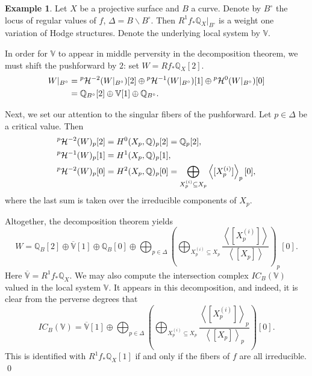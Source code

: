 \documentclass[12pt]{amsart}
\newcommand{\Q}{\mathbb{Q}}
\newcommand{\ol}{\overline}
\newcommand{\pH}{\prescript{p}{}{\mathcal{H}}}
\theoremstyle{definition}
\newtheorem{example}[theorem]{Example}
\theoremstyle{remark}
\numberwithin{equation}{section}
\begin{document}
\begin{example}
Let \(X\) be a projective surface and \(B\) a curve. Denote by \(B^\circ\) the locus 
of regular values of \(f\), \(\Delta = B \smallsetminus B^\circ\). Then
\(R^1 f_* \Q_X|_{B^\circ}\) is a weight one variation of Hodge structures. Denote 
the underlying local system by \(\mathbb{V}\).

In order for \(\mathbb{V}\) to appear in middle perversity in the decomposition theorem, 
we must shift the pushforward by \(2\): set \(W = Rf_* \Q_X[2]\).
\begin{align*}
    W|_{B^\circ} &= \pH^{-2}(W|_{B^\circ})[2] \oplus 
    \pH^{-1}(W|_{B^\circ})[1] \oplus \pH^0(W|_{B^\circ})[0] \\
    &= \Q_{B^\circ}[2] \oplus \mathbb{V}[1] \oplus \Q_{B^\circ}.
\end{align*}

Next, we set our attention to the singular fibers of the pushforward. Let 
\(p \in \Delta\) be a critical value. Then
\begin{align*}
    \pH^{-2}(W)_p[2] &= H^0(X_p, \Q)_p[2] = \Q_p[2], \\
    \pH^{-1}(W)_p[1] &= H^1(X_p, \Q)_p[1], \\
    \pH^{-2}(W)_p[0] &= H^2(X_p, \Q)_p[0] = \bigoplus_{X_p^{(i)} \subseteq X_p}
    \left<[X_p^{(i)}]\right>_p[0],
\end{align*}
where the last sum is taken over the irreducible components of \(X_p\).

Altogether, the decomposition theorem yields
\begin{equation} \label{eq-example-decomp-wt1-loc}
    W = \Q_B[2] \oplus \ol{\mathbb{V}}[1] \oplus \Q_B[0] \oplus \bigoplus_{p \in \Delta} 
    \left(\bigoplus_{X_p^{(i)} \subseteq X_p} 
    \frac{\left<[X_p^{(i)}]\right>}{\left<[X_p]\right>}\right)_p[0].
\end{equation}
Here \(\ol{\mathbb{V}} = R^1 f_* \Q_X\). We may also compute the intersection complex 
\(IC_B(\mathbb{V})\) valued in the local system \(\mathbb{V}\). It appears in this 
decomposition, and indeed, it is clear from the perverse degrees that 
\begin{equation}
    IC_B(\mathbb{V}) = \ol{\mathbb{V}}[1] \oplus \bigoplus_{p \in \Delta} 
    \left(\bigoplus_{X_p^{(i)} \subseteq X_p} 
    \frac{\left<[X_p^{(i)}]\right>_p}{\left<[X_p]\right>_p}\right)[0].
\end{equation}
This is identified with \(R^1 f_* \Q_X[1]\) if and only if the fibers of \(f\) are 
all irreducible.
\qed
\end{example}
\end{document}
